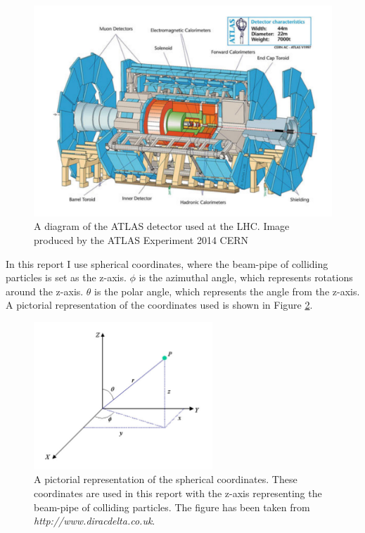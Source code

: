 \documentclass[a4paper,11pt, onecolumn]{article}
\begin{document}
 \begin{figure}[!h]
   \begin{center}
     \includegraphics[width = \textwidth]{ATLAS}
     \caption{A diagram of the ATLAS detector used at the LHC. Image produced by the
       ATLAS Experiment \textcopyright \hspace{1mm} 2014 CERN}
     \label{ATLAS}
   \end{center}
 \end{figure}
 
 In this report I use spherical coordinates, where the beam-pipe of colliding particles is set as the z-axis. $\phi$ is the azimuthal angle, which represents
 rotations around the z-axis. $\theta$ is the polar angle, which represents the angle from the z-axis. A pictorial representation of the coordinates used is shown
 in Figure \ref{spherical}.

  \begin{figure}[!ht]
    \begin{center}
      \includegraphics[width = 0.6\textwidth]{spherical}
      \caption{A pictorial representation of the spherical coordinates. These coordinates are used in this report with the z-axis representing the beam-pipe of
               colliding particles. The figure has been taken from \emph{http://www.diracdelta.co.uk}.}
      \label{spherical}
    \end{center}
  \end{figure}
  
\end{document}
